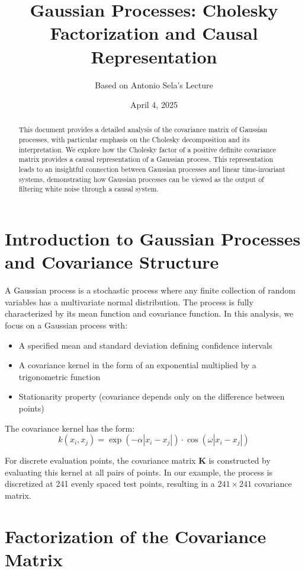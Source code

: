 \documentclass{article}
\title{Gaussian Processes: Cholesky Factorization and Causal Representation}
\author{Based on Antonio Sela's Lecture}
\date{April 4, 2025}
\begin{document}
\maketitle

\begin{abstract}
This document provides a detailed analysis of the covariance matrix of Gaussian processes, with particular emphasis on the Cholesky decomposition and its interpretation. We explore how the Cholesky factor of a positive definite covariance matrix provides a causal representation of a Gaussian process. This representation leads to an insightful connection between Gaussian processes and linear time-invariant systems, demonstrating how Gaussian processes can be viewed as the output of filtering white noise through a causal system.
\end{abstract}

\section{Introduction to Gaussian Processes and Covariance Structure}

A Gaussian process is a stochastic process where any finite collection of random variables has a multivariate normal distribution. The process is fully characterized by its mean function and covariance function. In this analysis, we focus on a Gaussian process with:
\begin{itemize}
    \item A specified mean and standard deviation defining confidence intervals
    \item A covariance kernel in the form of an exponential multiplied by a trigonometric function
    \item Stationarity property (covariance depends only on the difference between points)
\end{itemize}

The covariance kernel has the form:
\begin{equation}
k(x_i, x_j) = \exp(-\alpha|x_i - x_j|) \cdot \cos(\omega|x_i - x_j|)
\end{equation}

For discrete evaluation points, the covariance matrix $\mathbf{K}$ is constructed by evaluating this kernel at all pairs of points. In our example, the process is discretized at 241 evenly spaced test points, resulting in a $241 \times 241$ covariance matrix.

\section{Factorization of the Covariance Matrix}
\end{document}
